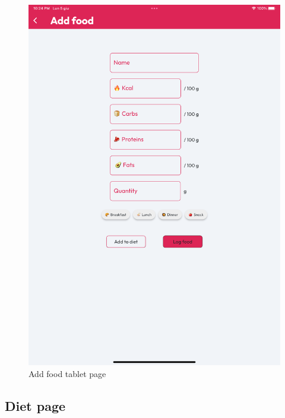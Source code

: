 \documentclass{Configuration_Files/PoliMi3i_thesis}
\begin{document}
\begin{figure}[!h]
  \includegraphics[scale=0.1]{Images/Screenshots/Tablet/AddFoodTabletLight.png}
  \caption{Add food tablet page}
\end{figure}

\clearpage

\subsection{Diet page}
\end{document}

